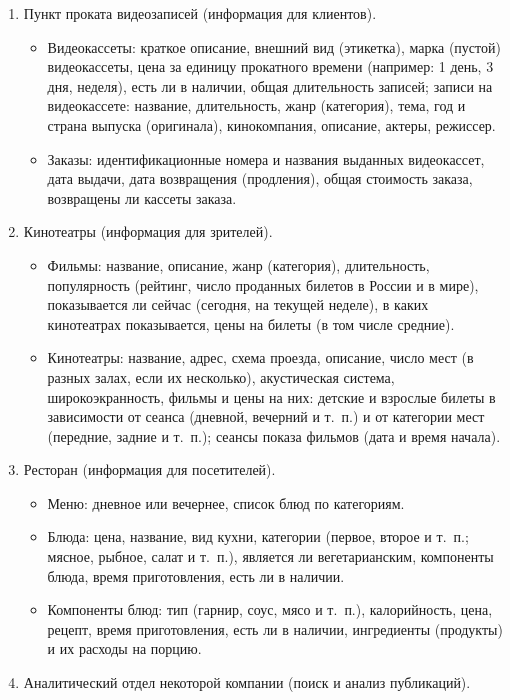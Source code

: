 \documentclass[12pt, openany, twoside]{book} %
\begin{document}
\begin{enumerate}
\begin{itemize}
\end{itemize}
\item Пункт проката видеозаписей (информация для клиентов).
\begin{itemize}
\item Видеокассеты: краткое описание, внешний вид (этикетка), марка (пустой) видеокассеты, цена за единицу прокатного времени (например: 1 день, 3 дня, неделя), есть ли в наличии, общая длительность записей; записи на видеокассете: название, длительность, жанр (категория), тема, год и страна выпуска (оригинала), кинокомпания, описание, актеры, режиссер.
\item Заказы: идентификационные номера и названия выданных видеокассет, дата выдачи, дата возвращения (продления), общая стоимость заказа, возвращены ли кассеты заказа.
\end{itemize}
\item Кинотеатры (информация для зрителей).
\begin{itemize}
\item Фильмы: название, описание, жанр (категория), длительность, популярность (рейтинг, число проданных билетов в России и в мире), показывается ли сейчас (сегодня, на текущей неделе), в каких кинотеатрах показывается, цены на билеты (в том числе средние).
\item Кинотеатры: название, адрес, схема проезда, описание, число мест (в разных залах, если их несколько), акустическая система, широкоэкранность, фильмы и цены на них: детские и взрослые билеты в зависимости от сеанса (дневной, вечерний и т.~п.) и от категории мест (передние, задние и т.~п.); сеансы показа фильмов (дата и время начала).
\end{itemize}
\item Ресторан (информация для посетителей).
\begin{itemize}
\item Меню: дневное или вечернее, список блюд по категориям.
\item Блюда: цена, название, вид кухни, категории (первое, второе и т.~п.; мясное, рыбное, салат и т.~п.), является ли вегетарианским, компоненты блюда, время приготовления, есть ли в наличии.
\item Компоненты блюд: тип (гарнир, соус, мясо и т.~п.), калорийность, цена, рецепт, время приготовления, есть ли в наличии, ингредиенты (продукты) и их расходы на порцию.
\end{itemize}
\item Аналитический отдел некоторой компании (поиск и анализ публикаций).
\begin{itemize}

\end{itemize}
\end{enumerate}
\end{document}
